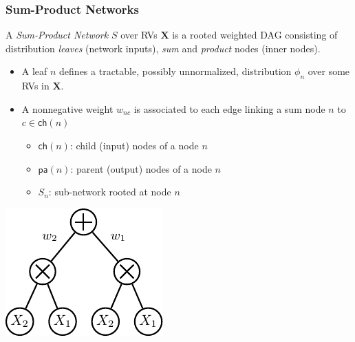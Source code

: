 \documentclass[10pt, t, xcolor={usenames,dvipsnames,svgnames}, compress]{beamer}
\begin{document}
\begin{frame}
  \frametitle{Sum-Product Networks}
  A \emph{Sum-Product Network} $S$ over RVs $\mathbf X$ is a
  rooted weighted DAG consisting of
  distribution \emph{leaves} (network inputs),  \emph{sum} and \emph{product}
  nodes (inner nodes).

\vspace{0.5 cm}
\begin{minipage}{0.65\textwidth}
\begin{itemize}
\item  A leaf $n$ defines a tractable, possibly unnormalized, distribution
  $\phi_{n}$ over some RVs in $\mathbf X$.
\item  A nonnegative weight $w_{nc}$ is associated to each edge linking a sum node
  $n$ to $c\in\mathsf{ch}(n)$
\begin{itemize}
\item $\mathsf{ch}(n)$:  child (input) nodes of   a node $n$ 
\item $\mathsf{pa}(n)$:  parent (output) nodes of a node $n$
\item $S_{n}$: sub-network rooted at node $n$ 
\end{itemize}
\end{itemize}
\end{minipage}
\begin{minipage}{0.3\textwidth}
\centering
\includegraphics[width=0.9\columnwidth]{figures/spn-mixture.pdf}
\end{minipage}
\end{frame}
\end{document}

